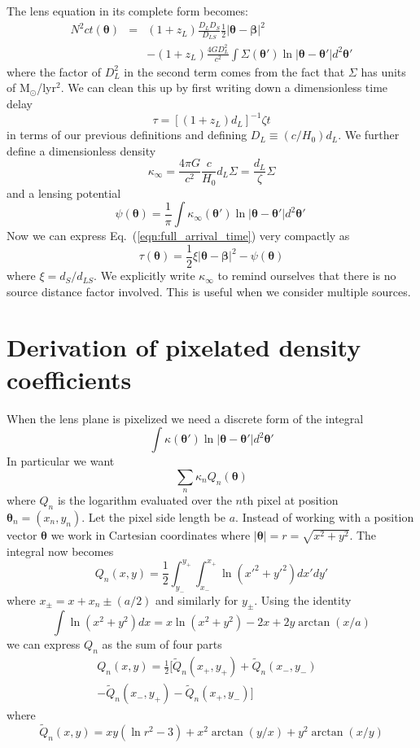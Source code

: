 \documentclass[galley,usenatbib]{mn2e}
\renewcommand{\vec}[1]{\ensuremath{\boldsymbol{#1}}}
\newcommand{\Msun}{\ensuremath{\mathrm{M}_\odot}}
\newcommand{\eqnref}[1] {Eq.~(\ref{#1})}
\begin{document}
The lens equation in its complete form becomes:
%
\begin{eqnarray}
N^2ct(\vec\theta) & = & (1+z_L)\frac{D_{L}D_{S}}{D_{LS}}\frac12 |\vec\theta - \vec\beta|^2 \nonumber \\
& & - (1+z_L)\frac{4GD_{L}^2}{c^2}\int \Sigma(\vec\theta') \ln |\vec\theta-\vec\theta'| d^2\vec\theta'
\label{eqn:full_arrival_time}
\end{eqnarray}
%
where the factor of $D_L^2$ in the second term comes from the fact that
$\Sigma$ has units of \Msun/lyr$^2$. We can clean this up by first writing down
a dimensionless time delay
%
\begin{equation}
\tau = \left[ (1+z_L) d_L\right]^{-1}\zeta t
\label{tau}
\end{equation}
%
in terms of our previous definitions and defining $D_L \equiv (c/H_0)d_L$. We
further define a dimensionless density
%
\begin{equation}
\kappa_\infty = \frac{4\pi G}{c^2}\frac{c}{H_0}d_L\Sigma
              = \frac{d_L}{\zeta}\Sigma
\end{equation}
%
and a lensing potential
%
\begin{equation}
\psi(\vec\theta) = \frac1\pi \int \kappa_\infty(\vec\theta') \ln|\vec\theta - \vec\theta'| d^2\vec\theta'\
\label{lensing potential}
\end{equation}
%
Now we can express \eqnref{eqn:full_arrival_time} very compactly as
%
\begin{equation}
\tau(\vec\theta) = \frac12 \xi |\vec\theta-\vec\beta|^2 - \psi(\vec\theta)
\label{arrival time}
\end{equation}
%
where $\xi=d_S / d_{LS}$.  We explicitly write $\kappa_\infty$ to remind
ourselves that there is no source distance factor involved. This is useful when
we consider multiple sources.

\section{Derivation of pixelated density coefficients}
\label{Q derivation}
When the lens plane is pixelized we need a discrete form of the integral
%
\[\int \kappa(\vec\theta') \ln |\vec\theta-\vec\theta'| d^2\vec\theta' \]
%
In particular we want
%
\[\sum_n \kappa_n Q_n(\vec\theta)\]
%
where $Q_n$ is the logarithm evaluated over the $n$th pixel at position
$\vec\theta_n = (x_n, y_n)$. Let the pixel side length be $a$.  Instead of
working with a position vector $\vec\theta$ we work in Cartesian coordinates
where 
%
$|\vec\theta| = r = \sqrt{x^2 + y^2}$. The integral now becomes
%
\[Q_n(x,y) = \frac12 \int_{y_-}^{y_+}\int_{x_-}^{x_+} \ln (x'^2+y'^2) dx' dy'\]
%
where $x_\pm = x + x_n \pm (a/2)$ and similarly for $y_\pm$.
Using the identity
%
\[\int \ln(x^2+y^2) dx = x \ln(x^2+y^2) - 2x + 2y\arctan(x/a) \]
%
we can express $Q_n$ as the sum of four parts
%
\begin{align*}
Q_n(x,y) = \frac12 [\tilde Q_n(x_+,y_+)
                  + \tilde Q_n(x_-,y_-) & 
\\                - \tilde Q_n(x_-,y_+)
                  - \tilde Q_n(x_+,y_-) ]
\end{align*}
%
where
%
\[\tilde Q_n(x,y) = xy(\ln r^2 - 3) + x^2\arctan(y/x) + y^2\arctan(x/y)\]
\end{document}
